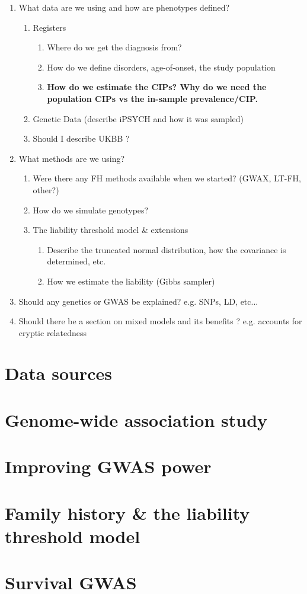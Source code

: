 
\begin{enumerate}
	\item What data are we using and how are phenotypes defined?
		\begin{enumerate}
			\item Registers
			\begin{enumerate}
				\item Where do we get the diagnosis from? 
				\item How do we define disorders, age-of-onset, the study population
				\item \textbf{ How do we estimate the CIPs? Why do we need the population CIPs vs the in-sample prevalence/CIP.}
			\end{enumerate}
			\item Genetic Data (describe iPSYCH and how it was sampled)
			\item Should I describe UKBB ?
		\end{enumerate}
	\item What methods are we using?
	\begin{enumerate}
		\item Were there any FH methods available when we started? (GWAX, LT-FH, other?)
		\item How do we simulate genotypes?
		\item The liability threshold model \& extensions
		\begin{enumerate}
			\item Describe the truncated normal distribution, how the covariance is determined, etc.
			\item How we estimate the liability (Gibbs sampler)
		\end{enumerate}
	\end{enumerate} 
	\item Should any genetics or GWAS be explained? e.g. SNPs, LD, etc... 
	\item Should there be a section on mixed models and its benefits ? e.g. accounts for cryptic relatedness
\end{enumerate}


\section{Data sources}




\section{Genome-wide association study}


\section{Improving GWAS power}


\section{Family history \& the liability threshold model}


\section{Survival GWAS}






